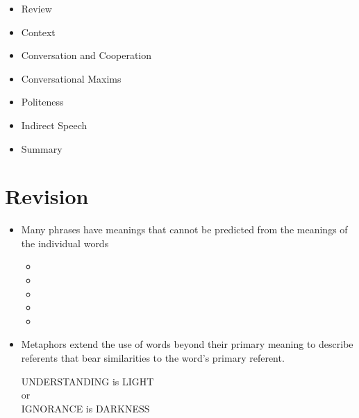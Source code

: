 \documentclass[a4paper,landscape,headrule,footrule,xetex]{foils}
\begin{document}
\maketitle

%



\begin{itemize}
\item Review
\item Context
\item Conversation and Cooperation
\item Conversational Maxims
\item Politeness
\item Indirect Speech
\item Summary

\end{itemize}

\section{Revision}

\begin{itemize}
\item Many phrases have meanings that cannot be predicted from the meanings of the individual words
  \begin{itemize}
  \item {}
  \item {}
  \item {}
  \item {}
  \item {}
  \end{itemize}
\item Metaphors extend the use of words beyond their primary meaning
  to describe referents that bear similarities to the word's primary
  referent.
\begin{exe}
  \ex {}
\end{exe}
\begin{center}
UNDERSTANDING is LIGHT \\ or \\ IGNORANCE is DARKNESS
\end{center}
\end{itemize}
\end{document}
